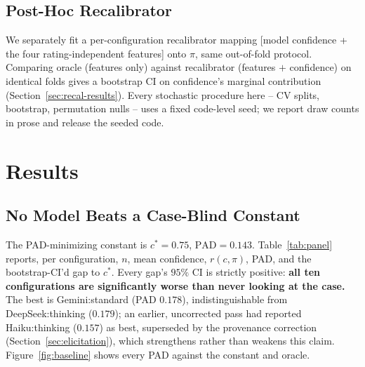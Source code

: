 \documentclass[letterpaper]{article} %
\begin{document}
\subsection{Post-Hoc Recalibrator}
\label{sec:recal}
We separately fit a per-configuration recalibrator mapping [model confidence
+ the four rating-independent features] onto $\pi$, same out-of-fold
protocol. Comparing oracle (features only) against recalibrator (features
$+$ confidence) on identical folds gives a bootstrap CI on confidence's
marginal contribution (Section~\ref{sec:recal-results}). Every stochastic
procedure here -- CV splits, bootstrap, permutation nulls -- uses a fixed
code-level seed; we report draw counts in prose and release the seeded code.

\section{Results}

\subsection{No Model Beats a Case-Blind Constant}
\label{sec:baseline}
The PAD-minimizing constant is $c^\ast{=}0.75$, $\mathrm{PAD}{=}0.143$.
Table~\ref{tab:panel} reports, per configuration, $n$, mean confidence,
$r(c,\pi)$, PAD, and the bootstrap-CI'd gap to $c^\ast$. Every gap's $95\%$
CI is strictly positive: \textbf{all ten configurations are significantly
worse than never looking at the case.} The best is Gemini:standard (PAD
$0.178$), indistinguishable from DeepSeek:thinking ($0.179$); an earlier,
uncorrected pass had reported Haiku:thinking ($0.157$) as best, superseded by
the provenance correction (Section~\ref{sec:elicitation}), which strengthens
rather than weakens this claim. Figure~\ref{fig:baseline} shows every PAD
against the constant and oracle.
\end{document}
